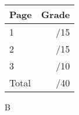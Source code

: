\documentclass[12pt]{article}
\newcommand{\skipline}{\vspace{12pt}}
\begin{document}
\begin{table}[hbt]
\begin{center}
\begin{tabular}{|l|r|} \hline
Page&Grade\\
\hline \hline
\cline{1-2} 1 & \enspace\enspace\enspace\enspace\enspace\enspace/15\\
\cline{1-2} 2 & \enspace\enspace\enspace\enspace\enspace\enspace/15\\
\cline{1-2} 3 & \enspace\enspace\enspace\enspace\enspace\enspace/10\\
\cline{1-2} Total & \enspace\enspace\enspace\enspace\enspace\enspace/40\\
\hline
\end{tabular}

\skipline

\skipline

\skipline

B
\end{center}
\end{table}
\newpage
\end{document}
